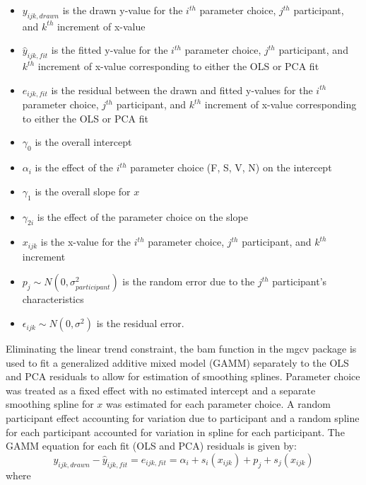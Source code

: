 \documentclass[12pt]{article}
\providecommand{\tightlist}{%
  \setlength{\itemsep}{0pt}\setlength{\parskip}{0pt}}
\begin{document}
\begin{itemize}
\tightlist
\item
  \(y_{ijk,drawn}\) is the drawn y-value for the \(i^{th}\) parameter
  choice, \(j^{th}\) participant, and \(k^{th}\) increment of x-value
\item
  \(\hat y_{ijk,fit}\) is the fitted y-value for the \(i^{th}\)
  parameter choice, \(j^{th}\) participant, and \(k^{th}\) increment of
  x-value corresponding to either the OLS or PCA fit
\item
  \(e_{ijk,fit}\) is the residual between the drawn and fitted y-values
  for the \(i^{th}\) parameter choice, \(j^{th}\) participant, and
  \(k^{th}\) increment of x-value corresponding to either the OLS or PCA
  fit
\item
  \(\gamma_0\) is the overall intercept
\item
  \(\alpha_i\) is the effect of the \(i^{th}\) parameter choice (F, S,
  V, N) on the intercept
\item
  \(\gamma_1\) is the overall slope for \(x\)
\item
  \(\gamma_{2i}\) is the effect of the parameter choice on the slope
\item
  \(x_{ijk}\) is the x-value for the \(i^{th}\) parameter choice,
  \(j^{th}\) participant, and \(k^{th}\) increment
\item
  \(p_{j} \sim N(0, \sigma^2_{participant})\) is the random error due to
  the \(j^{th}\) participant's characteristics
\item
  \(\epsilon_{ijk} \sim N(0, \sigma^2)\) is the residual error.
\end{itemize}

Eliminating the linear trend constraint, the bam function in the mgcv
package \citep{mgcv1, mgcv2, mgcv3, mgcv4, mgcv5} is used to fit a
generalized additive mixed model (GAMM) separately to the OLS and PCA
residuals to allow for estimation of smoothing splines. Parameter choice
was treated as a fixed effect with no estimated intercept and a separate
smoothing spline for \(x\) was estimated for each parameter choice. A
random participant effect accounting for variation due to participant
and a random spline for each participant accounted for variation in
spline for each participant. The GAMM equation for each fit (OLS and
PCA) residuals is given by: \begin{equation}
y_{ijk, drawn} - \hat y_{ijk, fit} = e_{ijk,fit} = \alpha_i + s_{i}(x_{ijk}) + p_{j} + s_{j}(x_{ijk})
\end{equation} \noindent where
\end{document}
